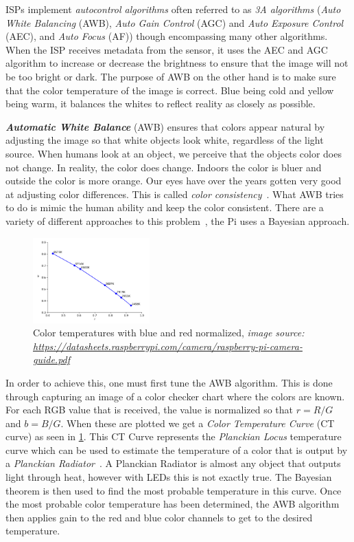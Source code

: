 ISPs implement \textit{autocontrol algorithms} often referred to as \textit{3A algorithms} (\textit{Auto
White Balancing} (AWB), \textit{Auto Gain Control} (AGC) and \textit{Auto
Exposure Control} (AEC), and \textit{Auto Focus} (AF)) though encompassing many
other algorithms. When the ISP receives metadata from the sensor, it uses the
AEC and AGC algorithm to increase or decrease the brightness to ensure that the
image will not be too bright or dark. The purpose of AWB on the other hand is
to make sure that the color temperature of the image is correct. Blue being cold and
yellow being warm, it balances the whites to reflect reality as closely as
possible.

\textit{\textbf{Automatic White Balance}} (AWB) ensures that colors appear
natural by adjusting the image so that white objects look white, regardless of
the light source. When humans look at an object, we perceive that the objects color
does not change. In reality, the color does change. Indoors the color
is bluer and outside the color is more orange. Our eyes have over the years
gotten very good at adjusting color differences. This is called \textit{color
consistency}~\cite{foster2011color, ebner2021color}. What AWB tries to do is
mimic the human ability and keep the color consistent. There are a variety of
different approaches to this problem~\cite{agarwal2006overview}, the Pi uses a
Bayesian approach.

\begin{figure}
    \begin{center}
        \includegraphics[width=0.4\textwidth]{figures/temperature.png}
    \end{center}
    \caption{Color temperatures with blue and red normalized, \textit{image source: \url{https://datasheets.raspberrypi.com/camera/raspberry-pi-camera-guide.pdf}}}\label{fig:temperatures}
\end{figure}
In order to achieve this, one must first tune the AWB algorithm. This is done
through capturing an image of a color checker chart where the colors are known.
For each RGB value that is received, the value is normalized so that $r = R /
G$ and $b = B / G$. When these are plotted we get a \textit{Color Temperature
Curve} (CT curve) as seen in \cref{fig:temperatures}. This CT Curve
represents the \textit{Planckian Locus}
temperature curve which can be used to estimate the temperature of a color that
is output by a \textit{Planckian Radiator}~\cite{international1957international}.
A Planckian Radiator is almost any object that outputs light through heat,
however with LEDs this is not exactly true. The Bayesian theorem is then used
to find the most probable temperature in this curve. Once the most probable
color temperature has been determined, the AWB algorithm then applies gain to
the red and blue color channels to get to the desired temperature.

